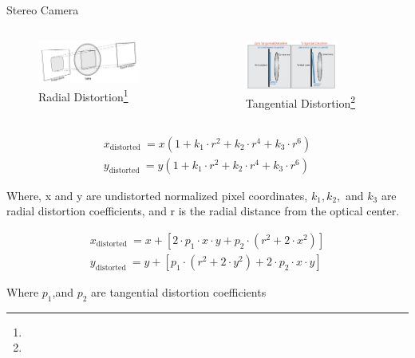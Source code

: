 \documentclass[10pt]{beamer}
\begin{document}
\begin{frame}{Stereo Camera}
      \begin{columns}
          \begin{figure}
              \centering
              \includegraphics[width=0.8\textwidth]{Images/radial.png}
              \caption{Radial Distortion\footnote[frame]{}}
          \end{figure}

          \begin{figure}
              \centering
              \includegraphics[width=0.7\textwidth]{Images/tangential.png}
              \caption{Tangential Distortion\footnote[frame]{}}
          \end{figure}
      \end{columns}
      
            $$\begin{array}{l}
            x_{\text {distorted }}=x\left(1+k_{1} \cdot r^{2}+k_{2} \cdot r^{4}+k_{3} \cdot r^{6}\right) \\
            y_{\text {distorted }}=y\left(1+k_{1} \cdot r^{2}+k_{2} \cdot r^{4}+k_{3} \cdot r^{6}\right)
            \end{array}$$
             
            Where, x and y are undistorted normalized pixel coordinates, $k_{1}, k_{2},$ and $k_{3}$ are radial distortion coefficients, and r is the radial distance from the optical center.   

             
            $$\begin{array}{l}
            x_{\text {distorted }}=x+\left[2 \cdot p_{1} \cdot x \cdot y+p_{2} \cdot \left(r^{2}+2 \cdot x^{2}\right)\right] \\
            y_{\text {distorted }}=y+\left[p_{1} \cdot\left(r^{2}+2 \cdot y^{2}\right)+2 \cdot p_{2} \cdot x \cdot y\right]
            \end{array}$$   
            
            Where $p_{1}$,and $p_{2}$ are tangential distortion coefficients
\end{frame}
\end{document}
